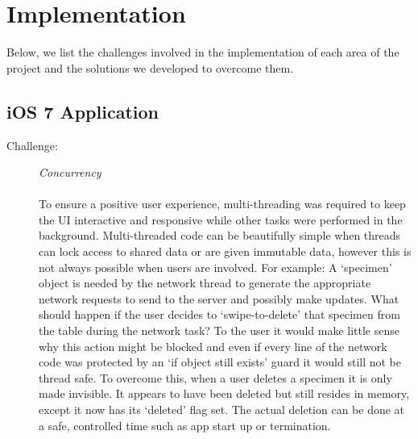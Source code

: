 \documentclass[a4paper,11pt]{article}
\begin{document}
\clearpage

\section{Implementation}

Below, we list the challenges involved in the implementation of each area of the project and the solutions we developed to overcome them.

\subsection{iOS 7 Application}
\begin{description}

\item [Challenge:] \textit{Concurrency}\\\\
To ensure a positive user experience, multi-threading was required to keep the UI interactive and responsive while other tasks were performed in the background. Multi-threaded code can be beautifully simple when threads can lock access to shared data or are given immutable data, however this is not always possible when users are involved. For example: A `specimen' object is needed by the network thread to generate the appropriate network requests to send to the server and possibly make updates. What should happen if the user decides to `swipe-to-delete' that specimen from the table during the network task? To the user it would make little sense why this action might be blocked and even if every line of the network code was protected by an `if object still exists' guard it would still not be thread safe. To overcome this, when a user deletes a specimen it is only made invisible. It appears to have been deleted but still resides in memory, except it now has its `deleted' flag set. The actual deletion can be done at a safe, controlled time such as app start up or termination.\\



\end{description}
\end{document}
